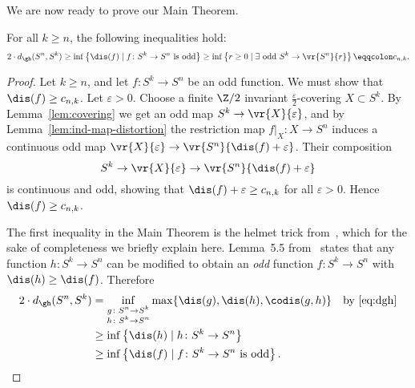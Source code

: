\documentclass[11pt, reqno, english]{amsart}
\begin{document}
We are now ready to prove our Main Theorem.

\begin{theorem-main}
For all $k \ge n$, the following inequalities hold:
\[
2\cdot d_{\gh}(S^n, S^k)
\ge \inf \left\{ \dis(f) \mid f \colon S^k \to S^n \textnormal{ is odd}\right\}
\ge \inf \left\{r\ge 0 \mid \exists \text{ odd }S^k \to \vr{S^n}{r}\right\} \eqqcolon c_{n,k}.
\]
\end{theorem-main}

\begin{proof}
Let $k\ge n$, and let $f \colon S^k \to S^n$ be an odd function.
We must show that $\dis(f) \ge c_{n,k}$.
Let $\varepsilon > 0$.
Choose a finite $\Z/2$ invariant $\tfrac{\varepsilon}{2}$-covering $X\subset S^k$.
By Lemma~\ref{lem:covering} we get an odd map $S^k \to \vr{X}{\varepsilon}$, and by Lemma~\ref{lem:ind-map-distortion} the restriction map $f|_X \colon X \to S^n$ induces a continuous odd map $\vr{X}{\varepsilon} \to \vr{S^n}{\dis(f)+\varepsilon}$.
Their composition
\[S^k \to \vr{X}{\varepsilon} \to \vr{S^n}{\dis(f)+\varepsilon}\]
is continuous and odd, showing that $\dis(f)+\varepsilon \ge c_{n,k}$ for all $\varepsilon > 0$.
Hence $\dis(f) \ge c_{n,k}$.

The first inequality in the Main Theorem is the helmet trick from~\cite{lim2021gromov}, which for the sake of completeness we briefly explain here.
Lemma~5.5 from~\cite{lim2021gromov} states that any function $h \colon S^k \to S^n$ can be modified to obtain an \emph{odd} function $f\colon S^k \to S^n$ with $\dis(h)\ge \dis(f)$.
Therefore
\begin{align*}
2\cdot d_{\gh}(S^n,S^k) &= \inf_{\substack{g\colon S^n \to S^k \\ h\colon S^k \to S^n}}\max\{\dis(g),\dis(h),\codis(g,h)\} && \text{by~\eqref{eq:dgh}}\\
&\ge \inf \left\{ \dis(h) \mid h \colon S^k \to S^n \right\} \\
&\ge \inf \left\{ \dis(f) \mid f \colon S^k \to S^n \textnormal{ is odd}\right\}.
\end{align*}
\end{proof}
\end{document}

